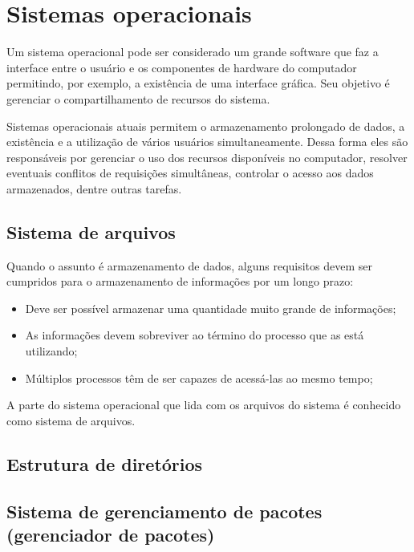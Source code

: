 \section{Sistemas operacionais}
    
    Um sistema operacional pode ser considerado um grande software que faz a interface entre o usuário e os componentes de hardware do computador permitindo, por exemplo, a existência de uma interface gráfica. Seu objetivo é gerenciar o compartilhamento de recursos do sistema.
      
    Sistemas operacionais atuais permitem o armazenamento prolongado de dados, a existência e a utilização de vários usuários simultaneamente. Dessa forma eles são responsáveis por gerenciar o uso dos recursos disponíveis no computador, resolver eventuais conflitos de requisições simultâneas, controlar o acesso aos dados armazenados, dentre outras tarefas.

    \subsection{Sistema de arquivos} %
        Quando o assunto é armazenamento de dados, alguns requisitos devem ser cumpridos para o armazenamento de informações por um longo prazo:

        \begin{itemize}
            \item Deve ser possível armazenar uma quantidade muito grande de informações;
            \item As informações devem sobreviver ao término do processo que as está utilizando;
            \item Múltiplos processos têm de ser capazes de acessá-las ao mesmo tempo;
        \end{itemize}

        A parte do sistema operacional que lida com os arquivos do sistema é conhecido como sistema de arquivos.

    \subsection{Estrutura de diretórios}

    \subsection{Sistema de gerenciamento de pacotes (gerenciador de pacotes)}

